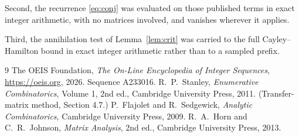 \documentclass[11pt,a4paper]{article}
\theoremstyle{plain}
\theoremstyle{definition}
\begin{document}
Second, the recurrence \eqref{eq:conj} was evaluated on those published terms in exact
integer arithmetic, with no matrices involved, and vanishes wherever it applies.

Third, the annihilation test of Lemma~\ref{lem:crit} was carried to the full
Cayley--Hamilton bound in exact integer arithmetic rather than to a sampled prefix.

\begin{thebibliography}{9}
 The OEIS Foundation, \emph{The On-Line Encyclopedia of Integer
Sequences}, \url{https://oeis.org}, 2026. Sequence A233016.
 R.~P.~Stanley, \emph{Enumerative Combinatorics}, Volume 1, 2nd ed.,
Cambridge University Press, 2011. (Transfer-matrix method, Section 4.7.)
 P.~Flajolet and R.~Sedgewick, \emph{Analytic Combinatorics}, Cambridge
University Press, 2009.
 R.~A.~Horn and C.~R.~Johnson, \emph{Matrix Analysis}, 2nd ed., Cambridge
University Press, 2013.
\end{thebibliography}
\end{document}
